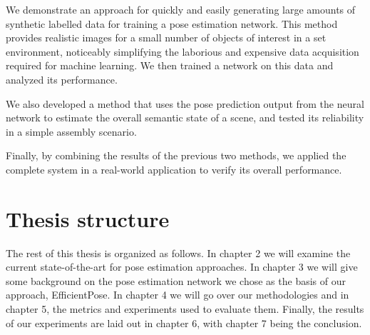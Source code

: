 We demonstrate an approach for quickly and easily generating large amounts of synthetic labelled data for training a pose estimation network. This method provides realistic images for a small number of objects of interest in a set environment, noticeably simplifying the laborious and expensive data acquisition required for machine learning. We then trained a network on this data and analyzed its performance.

We also developed a method that uses the pose prediction output from the neural network to estimate the overall semantic state of a scene, and tested its reliability in a simple assembly scenario.

Finally, by combining the results of the previous two methods, we applied the complete system in a real-world application to verify its overall performance. 

\section{Thesis structure}
The rest of this thesis is organized as follows. In chapter 2 we will examine the current state-of-the-art for pose estimation approaches. In chapter 3 we will give some background on the pose estimation network we chose as the basis of our approach, EfficientPose. In chapter 4 we will go over our methodologies and in chapter 5, the metrics and experiments used to evaluate them. Finally, the results of our experiments are laid out in chapter 6, with chapter 7 being the conclusion.
